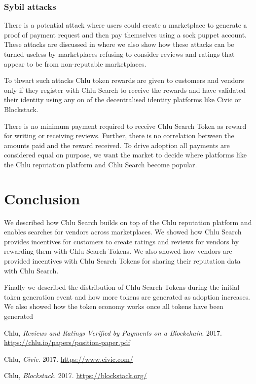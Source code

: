 \documentclass[a4paper]{article}
\begin{document}
\subsubsection{Sybil attacks}

There is a potential attack where users could create a marketplace to
generate a proof of payment request and then pay themselves using a
sock puppet account. These attacks are discussed in
\cite{chlu-reputation} where we also show how these attacks can be
turned useless by marketplaces refusing to consider reviews and
ratings that appear to be from non-reputable marketplaces.

To thwart such attacks Chlu token rewards are given to customers and
vendors only if they register with Chlu Search to receive the rewards
and have validated their identity using any on of the decentralised
identity platforms like Civic\cite{civic} or
Blockstack\cite{blockstack}.

There is no minimum payment required to receive Chlu Search Token as
reward for writing or receiving reviews. Further, there is no
correlation between the amounts paid and the reward received. To drive
adoption all payments are considered equal on purpose, we want the
market to decide where platforms like the Chlu reputation platform and
Chlu Search become popular.

\section{Conclusion}

We described how Chlu Search builds on top of the Chlu reputation
platform and enables searches for vendors across marketplaces. We
showed how Chlu Search provides incentives for customers to create
ratings and reviews for vendors by rewarding them with Chlu Search
Tokens. We also showed how vendors are provided incentives with Chlu
Search Tokens for sharing their reputation data with Chlu Search.

Finally we described the distribution of Chlu Search Tokens during the
initial token generation event and how more tokens are generated as
adoption increases. We also showed how the token economy works once
all tokens have been generated

\medskip
 
\begin{thebibliography}{9}

 Chlu, \textit{Reviews and Ratings Verified
  by Payments on a Blockchain}. 2017.
  \url{https://chlu.io/papers/position-paper.pdf}

 Chlu, \textit{Civic}. 2017.
  \url{https://www.civic.com/}

 Chlu, \textit{Blockstack}. 2017.
  \url{https://blockstack.org/}
  
\end{thebibliography}
\end{document}
